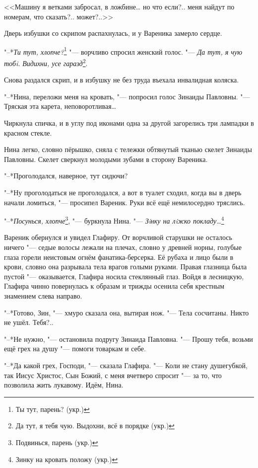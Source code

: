 <<Машину я ветками забросал, в ложбине\dots{} но что если?.. меня найдут по номерам, что сказать?.. может?..>>

Дверь избушки со скрипом распахнулась, и у Вареника замерло сердце.

"--*\textit{Ти тут, хлопче?}\footnote{Ты тут, парень? (укр.)} "--- ворчливо спросил женский голос.
"--- \textit{Да тут, я чую тобi.}
\textit{Видихни, усе гаразд}\footnote{Да тут, я тебя чую. Выдохни, всё в порядке (укр.)}.

Снова раздался скрип, и в избушку не без труда въехала инвалидная коляска.

"--*Нина, переложи меня на кровать, "--- попросил голос Зинаиды Павловны.
"--- Тряская эта карета, неповоротливая\dots{}

Чиркнула спичка, и в углу под иконами одна за другой загорелись три лампадки в красном стекле.

Нина легко, словно пёрышко, сняла с тележки обтянутый тканью скелет Зинаиды Павловны.
Скелет сверкнул молодыми зубами в сторону Вареника.

"--*Проголодался, наверное, тут сидючи?

"--*Ну проголодаться не проголодался, а вот в туалет сходил, когда вы в дверь начали ломиться, "--- просипел Вареник.
Руки всё ещё немилосердно тряслись.

"--*\textit{Посунься, хлопче}\footnote{Подвинься, парень (укр.)}, "--- буркнула Нина.
"--- \textit{Зiнку на лiжко покладу\dots}\footnote{Зинку на кровать положу (укр.)}

\asterism

\textspace

Вареник обернулся и увидел Глафиру.
От ворчливой старушки не осталось ничего "--- седые волосы лежали на плечах, словно у древней норны, голубые глаза горели неистовым огнём фанатика-берсерка.
Её рубаха и лицо были в крови, словно она разрывала тела врагов голыми руками.
Правая глазница была пустой "--- оказывается, Глафира носила стеклянный глаз.
Войдя в лесницкую, Глафира чинно повернулась к образам и трижды осенила себя крестным знамением слева направо.

"--*Готово, Зин, "--- хмуро сказала она, вытирая нож.
"--- Тела сосчитаны.
Никто не ушёл.
Тебя?..

"--*Не нужно, "--- остановила подругу Зинаида Павловна.
"--- Прошу тебя, возьми ещё грех на душу "--- помоги товаркам и себе.

"--*Да какой грех, Господи, "--- сказала Глафира.
"--- Коли не стану душегубкой, так Иисус Христос, Сын Божий, с меня вчетверо спросит "--- за то, что позволила жить лукавому.
Идём, Нина.

